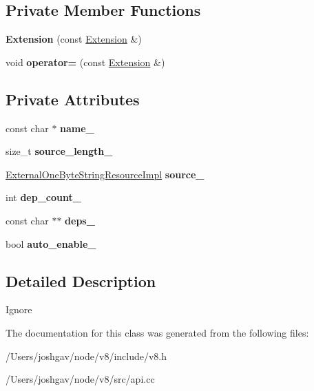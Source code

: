 \subsection*{Private Member Functions}
\begin{DoxyCompactItemize}
\item 
{\bfseries Extension} (const \hyperlink{classv8_1_1_extension}{Extension} \&)\hypertarget{classv8_1_1_extension_a27b882e3455c86303822c8012420a5b2}{}\label{classv8_1_1_extension_a27b882e3455c86303822c8012420a5b2}

\item 
void {\bfseries operator=} (const \hyperlink{classv8_1_1_extension}{Extension} \&)\hypertarget{classv8_1_1_extension_a648d5a0b99a45a0b0554301ab697e81c}{}\label{classv8_1_1_extension_a648d5a0b99a45a0b0554301ab697e81c}

\end{DoxyCompactItemize}
\subsection*{Private Attributes}
\begin{DoxyCompactItemize}
\item 
const char $\ast$ {\bfseries name\+\_\+}\hypertarget{classv8_1_1_extension_adcdd12a726668185217ad5623e6c5a43}{}\label{classv8_1_1_extension_adcdd12a726668185217ad5623e6c5a43}

\item 
size\+\_\+t {\bfseries source\+\_\+length\+\_\+}\hypertarget{classv8_1_1_extension_a7912969d063d4efe694e0450f6ecd8bc}{}\label{classv8_1_1_extension_a7912969d063d4efe694e0450f6ecd8bc}

\item 
\hyperlink{classv8_1_1_external_one_byte_string_resource_impl}{External\+One\+Byte\+String\+Resource\+Impl} {\bfseries source\+\_\+}\hypertarget{classv8_1_1_extension_ac9242897191bf63ad580715c8469d59b}{}\label{classv8_1_1_extension_ac9242897191bf63ad580715c8469d59b}

\item 
int {\bfseries dep\+\_\+count\+\_\+}\hypertarget{classv8_1_1_extension_ac892d429dd433624cfa4c865613465f5}{}\label{classv8_1_1_extension_ac892d429dd433624cfa4c865613465f5}

\item 
const char $\ast$$\ast$ {\bfseries deps\+\_\+}\hypertarget{classv8_1_1_extension_ae8198584f50edab2521b9344fa3d443f}{}\label{classv8_1_1_extension_ae8198584f50edab2521b9344fa3d443f}

\item 
bool {\bfseries auto\+\_\+enable\+\_\+}\hypertarget{classv8_1_1_extension_a4c7d7140358ffe5c661581af0238ea62}{}\label{classv8_1_1_extension_a4c7d7140358ffe5c661581af0238ea62}

\end{DoxyCompactItemize}


\subsection{Detailed Description}
Ignore 

The documentation for this class was generated from the following files\+:\begin{DoxyCompactItemize}
\item 
/\+Users/joshgav/node/v8/include/v8.\+h\item 
/\+Users/joshgav/node/v8/src/api.\+cc\end{DoxyCompactItemize}
